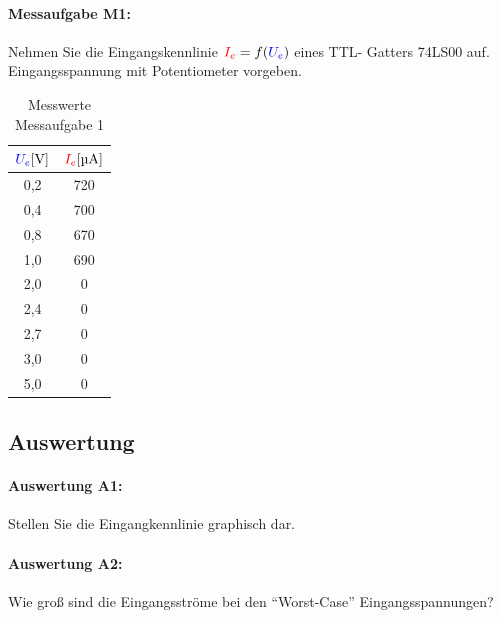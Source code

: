 \documentclass[11pt,a4paper,titlepage]{scrreprt}
\begin{document}
        \paragraph{Messaufgabe M1:} Nehmen Sie die Eingangskennlinie $\textcolor{red}{I_e} = f(\textcolor{blue}{U_e})$ eines TTL- Gatters 74LS00 auf. Eingangsspannung mit Potentiometer vorgeben.
            \begin{center}
                \begin{table}[!hbtp]
                    \caption{Messwerte Messaufgabe 1}
                    \renewcommand{\arraystretch}{1.3}
                    \begin{center}
                        \begin{tabular}{c|c}
                            $\textcolor{blue}{U_e} [\si{\volt}]$ & $\textcolor{red}{I_e} [\si{\micro\ampere}]$ \\ \hline
                            0,2 & 720\\
                            0,4 & 700\\
                            0,8 & 670\\
                            1,0 & 690\\
                            2,0 & 0\\
                            2,4 & 0\\
                            2,7 & 0\\
                            3,0 & 0\\
                            5,0 & 0\\
                        \end{tabular}
                    \end{center}
                \end{table}
            \end{center}


      \subsection{Auswertung}
        \paragraph{Auswertung A1:} Stellen Sie die Eingangkennlinie graphisch dar.


        \paragraph{Auswertung A2:} Wie groß sind die Eingangsströme bei den "`Worst-Case"' Eingangsspannungen?
\end{document}
